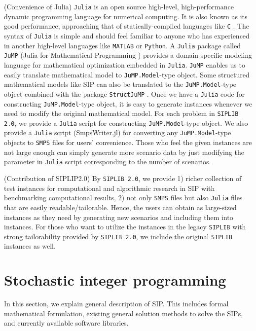 (Convenience of Julia) \texttt{Julia} is an open source high-level, high-performance dynamic programming language for numerical computing. It is also known as its good performance, approaching that of statically-compiled languages like \texttt{C} \cite{journal:BEKS2017}. The syntax of \texttt{Julia} is simple and should feel familiar to anyone who has experienced in another high-level languages like \texttt{MATLAB} or \texttt{Python}. A \texttt{Julia} package called \texttt{JuMP} (Julia for Mathematical Programming \cite{web:JuMP}) provides a domain-specific modeling language for mathematical optimization embedded in \texttt{Julia}. \texttt{JuMP} enables us to easily translate mathematical model to \texttt{JuMP.Model}-type object. Some structured mathematical models like SIP can also be translated to the \texttt{JuMP.Model}-type object combined with the package \texttt{StructJuMP} \cite{web:StructJuMP}. Once we have a \texttt{Julia} code for constructing \texttt{JuMP.Model}-type object, it is easy to generate instances whenever we need to modify the original mathematical model. For each problem in \texttt{SIPLIB 2.0}, we provide a \texttt{Julia} script for constructing \texttt{JuMP.Model}-type object. We also provide a \texttt{Julia} script (SmpsWriter.jl) for converting any \texttt{JuMP.Model}-type objects to \texttt{SMPS} files for users' convenience. Those who feel the given instances are not large enough can simply generate more scenario data by just modifying the parameter in \texttt{Julia} script corresponding to the number of scenarios.

(Contribution of SIPLIP2.0) By \texttt{SIPLIB 2.0}, we provide 1) richer collection of test instances for computational and algorithmic research in SIP with benchmarking computational results, 2) not only \texttt{SMPS} files but also \texttt{Julia} files that are easily readable/tailorable. Hence, the users can obtain as large-sized instances as they need by generating new scenarios and including them into instances. For those who want to utilize the instances in the legacy \texttt{SIPLIB} with strong tailorability provided by \texttt{SIPLIB 2.0}, we include the original \texttt{SIPLIB} instances as well.

\section{Stochastic integer programming}
In this section, we explain general description of SIP. This includes formal mathematical formulation, existing general solution methods to solve the SIPs, and currently available software libraries.
